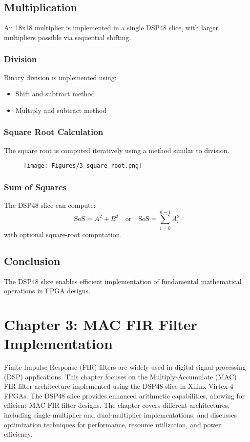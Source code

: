 \documentclass{article}
\begin{document}
	\subsection{Multiplication}
	An 18x18 multiplier is implemented in a single DSP48 slice, with larger multipliers possible via sequential shifting.
	
	\subsubsection{Division}
	Binary division is implemented using:
	\begin{itemize}
		\item Shift and subtract method
		\item Multiply and subtract method
	\end{itemize}
	
	\subsubsection{Square Root Calculation}
	The square root is computed iteratively using a method similar to division.
	
	\begin{figure}
		\centering
		\texttt{[image: Figures/3\_square\_root.png]}
		\label{fig:enter-label}
	\end{figure}
	
	\subsubsection{Sum of Squares}
	The DSP48 slice can compute:
	\[
	\text{SoS} = A^2 + B^2 \quad \text{or} \quad \text{SoS} = \sum_{i=0}^{n-1} A_i^2
	\]
	with optional square-root computation.
	
	\subsection{Conclusion}
	The DSP48 slice enables efficient implementation of fundamental mathematical operations in FPGA designs.
	
	\newpage
	
	\section{Chapter 3: MAC FIR Filter Implementation}
	Finite Impulse Response (FIR) filters are widely used in digital signal processing (DSP) applications. This chapter focuses on the Multiply-Accumulate (MAC) FIR filter architecture implemented using the DSP48 slice in Xilinx Virtex-4 FPGAs. The DSP48 slice provides enhanced arithmetic capabilities, allowing for efficient MAC FIR filter designs. The chapter covers different architectures, including single-multiplier and dual-multiplier implementations, and discusses optimization techniques for performance, resource utilization, and power efficiency.
	
\end{document}
